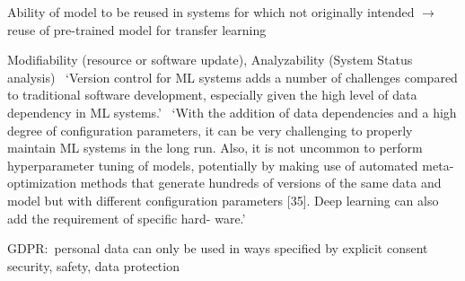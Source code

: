 Ability of model to be reused in systems for which not originally intended $\rightarrow$ reuse of
pre-trained model for transfer learning~\citep{ashmore_assuring_2021}

Modifiability (resource or software update), Analyzability (System Status
analysis)~\cite{nakamichi_requirements-driven_2020}
`Version control for ML systems adds a number of challenges compared to traditional software
development, especially given the high level of data dependency in ML
systems.'~\cite{arpteg_software_2018}
`With the addition of data dependencies and a high degree of configuration parameters, it can
be very challenging to properly maintain ML systems in the long run. Also, it is not uncommon to
perform hyperparameter tuning of models, potentially by making use of automated meta-optimization
methods that generate hundreds of versions of the same data and model but with different
configuration parameters [35]. Deep learning can also add the requirement of specific hard-
ware.'~\cite{arpteg_software_2018}

GDPR:\ personal data can only be used in ways specified by explicit consent~\cite{vogelsang_requirements_2019}
security, safety, data protection~\cite{siebert_construction_2021}
